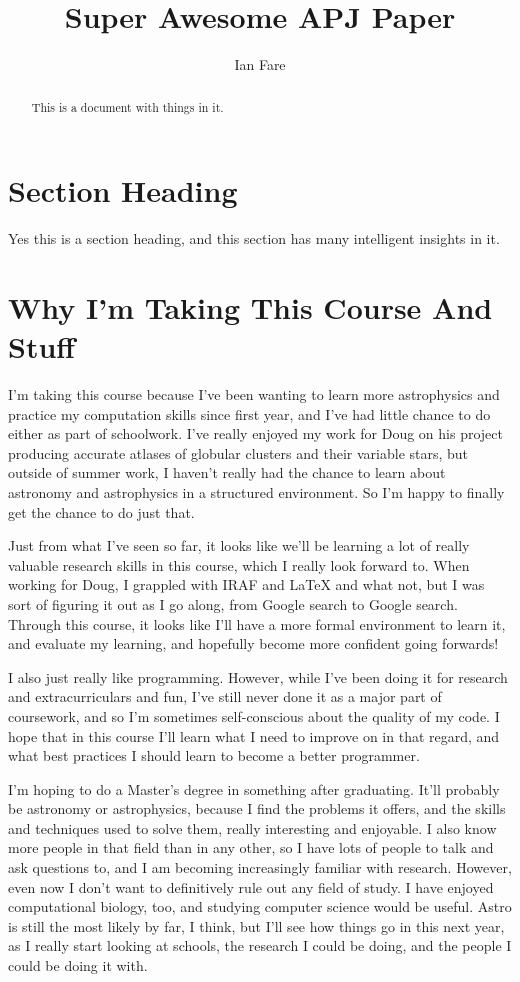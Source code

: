\documentclass[iop,apj,tighten]{emulateapj}
\begin{document}
\title{Super Awesome APJ Paper}
\author{Ian Fare}

\begin{abstract}
This is a document with things in it.
\end{abstract}

\maketitle

\section{Section Heading}
Yes this is a section heading, and this section has many intelligent insights in it.

\section{Why I'm Taking This Course And Stuff}
I'm taking this course because I've been wanting to learn more astrophysics and practice my computation skills since first year, and I've had little chance to do either as part of schoolwork. I've really enjoyed my work for Doug on his project producing accurate atlases of globular clusters and their variable stars, but outside of summer work, I haven't really had the chance to learn about astronomy and astrophysics in a structured environment. So I'm happy to finally get the chance to do just that.

Just from what I've seen so far, it looks like we'll be learning a lot of really valuable research skills in this course, which I really look forward to. When working for Doug, I grappled with IRAF and LaTeX and what not, but I was sort of figuring it out as I go along, from Google search to Google search. Through this course, it looks like I'll have a more formal environment to learn it, and evaluate my learning, and hopefully become more confident going forwards!

I also just really like programming. However, while I've been doing it for research and extracurriculars and fun, I've still never done it as a major part of coursework, and so I'm sometimes self-conscious about the quality of my code. I hope that in this course I'll learn what I need to improve on in that regard, and what best practices I should learn to become a better programmer.

I'm hoping to do a Master's degree in something after graduating. It'll probably be astronomy or astrophysics, because I find the problems it offers, and the skills and techniques used to solve them, really interesting and enjoyable. I also know more people in that field than in any other, so I have lots of people to talk and ask questions to, and I am becoming increasingly familiar with research. However, even now I don't want to definitively rule out any field of study. I have enjoyed computational biology, too, and studying computer science would be useful. Astro is still the most likely by far, I think, but I'll see how things go in this next year, as I really start looking at schools, the research I could be doing, and the people I could be doing it with.
\end{document}
